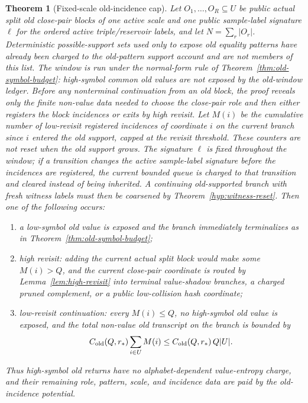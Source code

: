 \documentclass[11pt]{article}
\newtheorem{theorem}{Theorem}[section]
\begin{document}
\begin{theorem}[Fixed-scale old-incidence cap]
\label{hyp:old-window}
Let $O_1,\ldots,O_R\subseteq U$ be public actual split old close-pair blocks of
one active scale and one public sample-label signature $\ell$ for the ordered
active triple/reservoir labels, and let $N=\sum_r |O_r|$.  Deterministic
possible-support sets used only to expose old equality patterns have already
been charged to the old-pattern support account and are not members of this
list.  The window is run under the
normal-form rule of
Theorem~\ref{thm:old-symbol-budget}: high-symbol common old values are not
exposed by the old-window ledger.  Before any nonterminal continuation from an old block, the proof
reveals only the finite non-value data needed to choose the close-pair role and
then either registers the block incidences or exits by high revisit.  Let
$M(i)$ be the cumulative number of low-revisit registered incidences of
coordinate $i$ on the current branch since $i$ entered the old support, capped
at the revisit threshold.  These counters are not reset when the old support
grows.
The signature $\ell$ is fixed throughout the window; if a transition changes the
active sample-label signature before the incidences are registered, the current
bounded queue is charged to that transition and cleared instead of being
inherited.  A continuing old-supported branch with fresh witness labels must
then be coarsened by Theorem~\ref{hyp:witness-reset}.
Then one of the following occurs:
\begin{enumerate}[label=\textup{(\arabic*)}]
\item a low-symbol old value is exposed and the branch immediately terminalizes
as in Theorem~\ref{thm:old-symbol-budget};
\item high revisit: adding the current actual split block would make some
$M(i)>Q$, and the current close-pair coordinate is routed by
Lemma~\ref{lem:high-revisit} into
terminal value-shadow branches, a charged pruned complement, or a public
low-collision hash coordinate;
\item low-revisit continuation: every $M(i)\le Q$, no high-symbol old value is
exposed, and the total non-value old transcript on the branch is bounded by
\[
  C_{\rm old}(Q,r_*)\sum_{i\in U}M(i)
  \le C_{\rm old}(Q,r_*)\,Q|U|.
\]
\end{enumerate}
Thus high-symbol old returns have no alphabet-dependent value-entropy charge,
and their remaining role, pattern, scale, and incidence data are paid by the
old-incidence potential.
\end{theorem}
\end{document}
